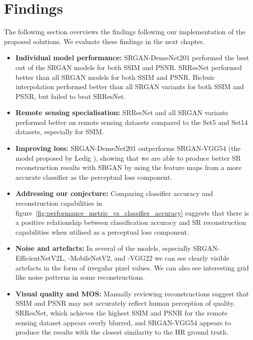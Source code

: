 \section{Findings}
The following section overviews the findings following our implementation of the proposed solutions. We evaluate these findings in the next chapter.
\begin{itemize}
    \item \textbf{Individual model performance:} SRGAN-DenseNet201 performed the best out of the SRGAN models for both SSIM and PSNR. SRResNet performed better than all SRGAN models for both SSIM and PSNR. Bicbuic interpolation performed better than all SRGAN variants for both SSIM and PSNR, but failed to beat SRResNet.
    \item \textbf{Remote sensing specialisation:} SRResNet and all SRGAN variants performed better on remote sensing datasets compared to the Set5 and Set14 datasets, especially for SSIM.
    \item \textbf{Improving loss:} SRGAN-DenseNet201 outperforms SRGAN-VGG54 (the model proposed by Ledig \etal), showing that we are able to produce better SR reconstruction results with SRGAN by using the feature maps from a more accurate classifier as the perceptual loss component.
    \item \textbf{Addressing our conjecture:} Comparing classifier accuracy and reconstruction capabilities in figure~\ref{fig:performance_metric_vs_classifier_accuracy} suggests that there is a positive relationship between classification accuracy and SR reconstruction capabilities when utilised as a perceptual loss component.
    \item \textbf{Noise and artefacts:} In several of the models, especially SRGAN-EfficientNetV2L, -MobileNetV2, and -VGG22 we can see clearly visible artefacts in the form of irregular pixel values. We can also see interesting grid like noise patterns in some reconstructions.
    \item \textbf{Visual quality and MOS:} Manually reviewing reconstructions suggest that SSIM and PSNR may not accurately reflect human perception of quality. SRResNet, which achieves the highest SSIM and PSNR for the remote sensing dataset appears overly blurred, and SRGAN-VGG54 appears to produce the results with the closest similarity to the HR ground truth.
\end{itemize}



